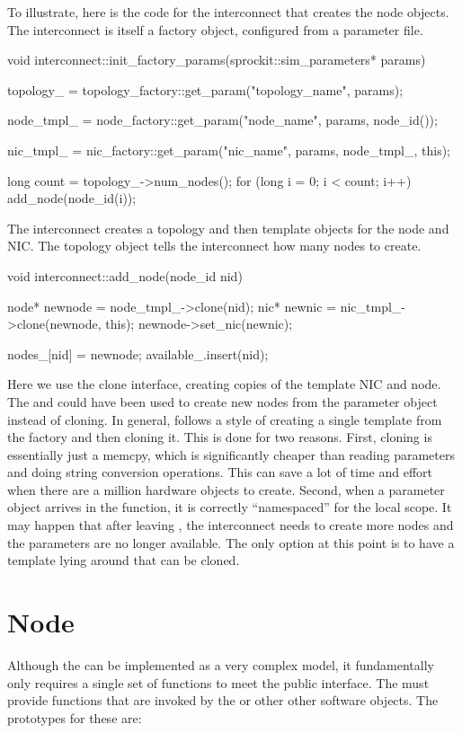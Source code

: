 To illustrate, here is the code for the interconnect that creates the node objects. 
The interconnect is itself a factory object, configured from a parameter file.

\begin{CppCode}
void
interconnect::init_factory_params(sprockit::sim_parameters* params)
{
  topology_ = topology_factory::get_param("topology_name", params);

  node_tmpl_ = node_factory::get_param("node_name", params, node_id());

  nic_tmpl_ = nic_factory::get_param("nic_name", params, node_tmpl_, this);

  long count = topology_->num_nodes();
  for (long i = 0; i < count; i++) {
    add_node(node_id(i));
  }
}
\end{CppCode}

The interconnect creates a topology and then template objects for the node and NIC.
The topology object tells the interconnect how many nodes to create.

\begin{CppCode}
void
interconnect::add_node(node_id nid)
{
  node* newnode = node_tmpl_->clone(nid);
  nic* newnic = nic_tmpl_->clone(newnode, this);
  newnode->set_nic(newnic);

  nodes_[nid] = newnode;
  available_.insert(nid);
}
\end{CppCode}

Here we use the clone interface, creating copies of the template NIC and node.
The  and  
could have been used to create new nodes from the parameter object instead of cloning.
In general, \sstmacro follows a style of creating a single template from the factory and then cloning it.
This is done for two reasons. 
First, cloning is essentially just a memcpy, which is significantly cheaper than reading parameters and doing string conversion operations.
This can save a lot of time and effort when there are a million hardware objects to create.
Second, when a parameter object arrives in the  function, it is correctly ``namespaced'' for the local scope.
It may happen that after leaving , the interconnect needs to create more nodes and the parameters are no longer available.
The only option at this point is to have a template lying around that can be cloned.

\section{Node}\label{sec:node}
Although the \nodecls can be implemented as a very complex model, it fundamentally only requires a single set of functions to meet the public interface.
The \nodecls must provide  functions that are invoked by the  or other other software objects.
The prototypes for these are:

